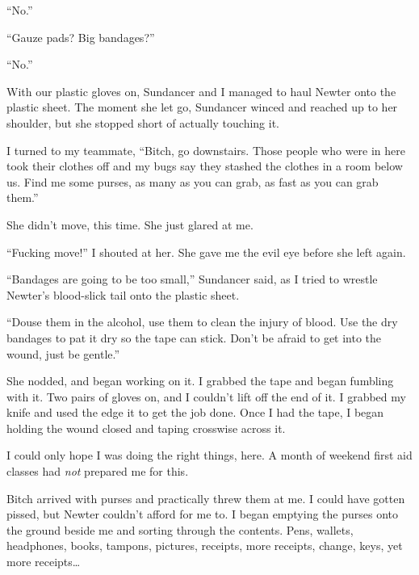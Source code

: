 ``No.''



``Gauze pads?  Big bandages?''



``No.''



With our plastic gloves on, Sundancer and I managed to haul Newter onto the plastic sheet.  The moment she let go, Sundancer winced and reached up to her shoulder, but she stopped short of actually touching it.



I turned to my teammate, ``Bitch, go downstairs.  Those people who were in here took their clothes off and my bugs say they stashed the clothes in a room below us.  Find me some purses, as many as you can grab, as fast as you can grab them.''



She didn't move, this time.  She just glared at me.



``Fucking move!'' I shouted at her.  She gave me the evil eye before she left again.



``Bandages are going to be too small,'' Sundancer said, as I tried to wrestle Newter's blood-slick tail onto the plastic sheet.



``Douse them in the alcohol, use them to clean the injury of blood.  Use the dry bandages to pat it dry so the tape can stick.  Don't be afraid to get into the wound, just be gentle.''



She nodded, and began working on it.  I grabbed the tape and began fumbling with it.  Two pairs of gloves on, and I couldn't lift off the end of it.  I grabbed my knife and used the edge it to get the job done.  Once I had the tape, I began holding the wound closed and taping crosswise across it.



I could only hope I was doing the right things, here.  A month of weekend first aid classes had \emph{not} prepared me for this.



Bitch arrived with purses and practically threw them at me.  I could have gotten pissed, but Newter couldn't afford for me to.  I began emptying the purses onto the ground beside me and sorting through the contents.  Pens, wallets, headphones, books, tampons, pictures, receipts, more receipts, change, keys, yet more receipts\ldots



